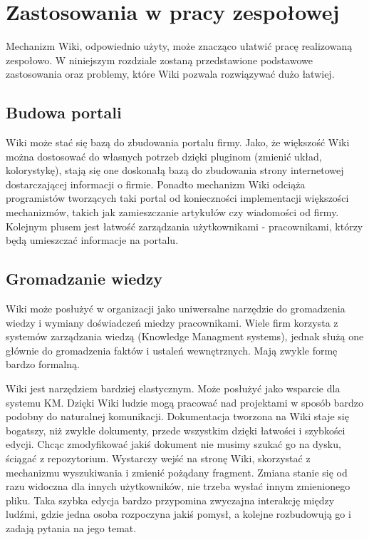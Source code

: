 \documentclass{article}
\begin{document}
	
	

\newpage
\section{Zastosowania w pracy zespołowej}
Mechanizm Wiki, odpowiednio użyty, może znacząco ułatwić pracę realizowaną zespołowo. W niniejszym rozdziale zostaną przedstawione podstawowe zastosowania oraz problemy, które Wiki pozwala rozwiązywać dużo łatwiej. 

	\subsection{Budowa portali}  

Wiki może stać się bazą do zbudowania portalu firmy. Jako, że większość Wiki można dostosować do własnych potrzeb dzięki pluginom (zmienić układ, kolorystykę), stają się one doskonałą bazą do zbudowania strony internetowej dostarczającej informacji o firmie. 
Ponadto mechanizm Wiki odciąża programistów tworzących taki portal od konieczności implementacji większości mechanizmów, takich jak zamieszczanie artykułów czy wiadomości od firmy.
Kolejnym plusem jest łatwość zarządzania użytkownikami - pracownikami, którzy będą umieszczać informacje na portalu.


	\subsection{Gromadzanie wiedzy}

		Wiki może posłużyć w organizacji jako uniwersalne narzędzie do gromadzenia wiedzy i wymiany doświadczeń miedzy pracownikami. Wiele firm korzysta z systemów zarządzania wiedzą (Knowledge Managment systems), jednak służą one głównie do gromadzenia faktów i ustaleń wewnętrznych. Mają zwykle formę bardzo formalną.

	Wiki jest narzędziem bardziej elastycznym. Może posłużyć jako wsparcie dla systemu KM. Dzięki Wiki ludzie mogą pracować nad projektami w sposób bardzo podobny do naturalnej komunikacji. Dokumentacja tworzona na Wiki staje się bogatszy, niż zwykłe dokumenty, przede wszystkim dzięki łatwości i szybkości edycji. Chcąc zmodyfikować jakiś dokument nie musimy szukać go na dysku, ściągać z repozytorium. Wystarczy wejść na stronę Wiki, skorzystać z mechanizmu wyszukiwania i zmienić pożądany fragment. Zmiana stanie się od razu widoczna dla innych użytkowników, nie trzeba wysłać innym zmienionego pliku. Taka szybka edycja bardzo przypomina zwyczajna interakcję między ludźmi, gdzie jedna osoba rozpoczyna jakiś pomysł, a kolejne rozbudowują go i zadają pytania na jego temat.
\end{document}
